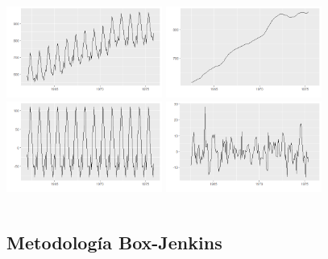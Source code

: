 \documentclass[10pt,a4paper,twoside]{beamer}
\begin{document}
\begin{frame}
\vspace{.5cm}

    \begin{columns}[t]
        \includegraphics[width=\columnwidth,height=3cm]{Images/serie.png}
        \includegraphics[width=\columnwidth,height=3cm]{Images/tend.png}
        \includegraphics[width=\columnwidth,height=3cm]{Images/season.png}
        \includegraphics[width=\columnwidth,height=3cm]{Images/random.png}
    \end{columns}

\end{frame}


\subsection{Metodología Box-Jenkins}
\end{document}
